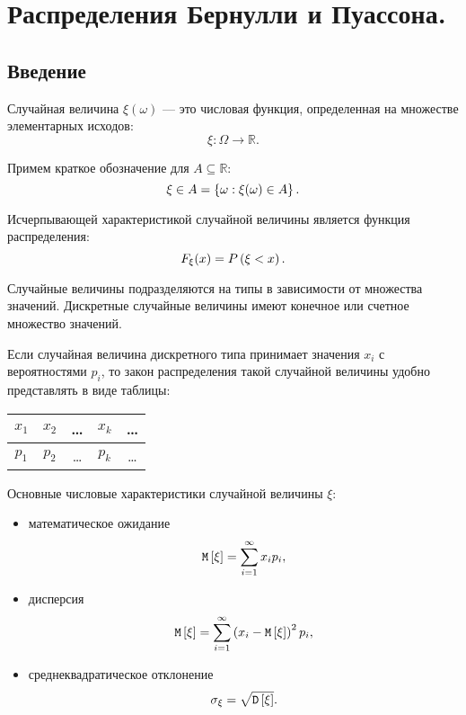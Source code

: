 \chapter{Распределения Бернулли и Пуассона.}

\section*{Введение}

Случайная величина $\xi(\omega)$ --- это числовая функция, определенная на множестве элементарных исходов:
\begin{equation}
    \xi : \Omega \rightarrow \mathbb{R}.
\end{equation}

Примем краткое обозначение для $A \subseteq \mathbb{R}$:
\begin{equation}
    \xi \in A = \left \{ \omega : \xi(\omega) \in A \right \}.
\end{equation}

Исчерпывающей характеристикой случайной величины является функция распределения:
\begin{equation}
    F_\xi(x) = P \left ( \xi < x \right ).
\end{equation}

Случайные величины подразделяются на типы в зависимости от множества значений. Дискретные случайные величины имеют
конечное или счетное множество значений.

Если случайная величина дискретного типа принимает значения $x_i$ с вероятностями $p_i$, то закон распределения такой случайной величины удобно представлять в виде таблицы:
\begin{center}
    \begin{tabular}{|c|c|c|c|c|}
        \hline
        $x_1$ & $x_2$ & \dots & $x_k$ & \dots \\
        \hline
        $p_1$ & $p_2$ & \dots & $p_k$ & \dots \\
        \hline
    \end{tabular}
\end{center}

Основные числовые характеристики случайной величины $\xi$:
\begin{itemize}
    \item математическое ожидание
    \begin{equation}
        \mathtt{M} \left [ \xi \right ] = \sum_{i=1}^{\infty} x_i p_i ,
    \end{equation}
    \item дисперсия
    \begin{equation}
        \mathtt{M} \left [ \xi \right ] = \sum_{i=1}^{\infty} \left ( x_i - \mathtt{M} \left [ \xi \right ] \right )^2 p_i ,
    \end{equation}
    \item среднеквадратическое отклонение
    \begin{equation}
        \sigma_\xi = \sqrt{\mathtt{D} \left [ \xi \right ]} .
    \end{equation}
\end{itemize}

